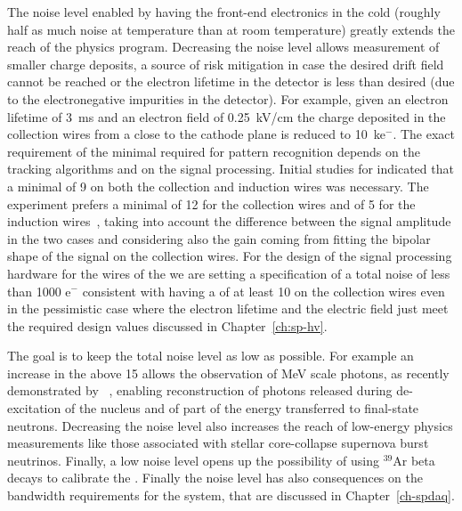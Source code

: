 The noise level enabled by having the front-end electronics in the cold (roughly 
half as much noise at  temperature than at room temperature) greatly 
extends the reach of the  physics program. Decreasing the noise level 
allows measurement of smaller charge deposits, a source of risk mitigation in 
case the desired drift field cannot be reached or the electron lifetime in the 
detector is less than desired (due to the electronegative impurities in the 
detector). For example, given an electron lifetime of \SI{3}{ms} and an electron field
of \SI{0.25}{kV/cm} the charge deposited in the collection wires from a 
 close to the cathode plane is reduced to \SI{10}{k}{e$^-$}.
The exact requirement of the minimal  required for pattern
recognition depends on the tracking algorithms and on the signal processing.
Initial studies for  indicated that a minimal  of 9 
on both the collection and induction wires was necessary. The 
 experiment prefers a minimal  of 12 for the
collection wires and of 5 for the induction wires~\cite{bib:sbnddoc1921}, taking into account
the difference between the signal amplitude in the two cases and considering
also the gain coming from fitting the bipolar shape of the signal on the
collection wires. For the design of the signal processing hardware for the
wires of the   we are setting a specification of
a total noise of less than 1000 e$^-$ consistent with having a 
of at least 10 on the collection wires even in the pessimistic case 
where the electron lifetime and the electric field just meet the
required design values discussed in Chapter~\ref{ch:sp-hv}.

The goal is to keep the total noise level as low as possible. For example an 
increase in the  above 15 allows the observation of MeV scale photons, 
as recently demonstrated by ~\cite{Acciarri:2018myr}, enabling 
reconstruction of photons released during de-excitation of the nucleus and of part
of the energy transferred to final-state neutrons.
Decreasing the noise level also increases the reach of low-energy 
physics measurements like those associated with stellar core-collapse supernova 
burst neutrinos. Finally, a low noise level opens up the possibility of using 
$\mathrm{{}^{39}Ar}$ beta decays to calibrate the  .
Finally the noise level has also consequences on the bandwidth requirements
for the  system, that are discussed in Chapter~\ref{ch-spdaq}.

